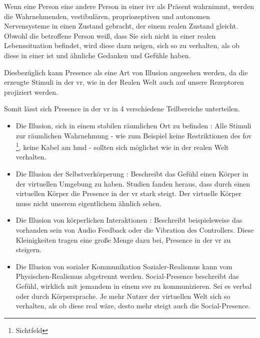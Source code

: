 \documentclass[a4paper,11pt]{article}%
\renewcommand{\\}{\vspace*{0.5\baselineskip} \newline}
\begin{document}
	Wenn eine Person eine andere Person in einer \ac{ivr} als Präsent wahrnimmt, werden die Wahrnehmenden, vestibulären, propriozeptiven und autonomen Nervensysteme in einen Zustand gebracht, der einem realen Zustand gleicht. Obwohl die betroffene Person weiß, dass Sie sich nicht in einer realen Lebenssituation befindet, wird diese dazu neigen, sich so zu verhalten, als ob diese in einer ist und ähnliche Gedanken und Gefühle haben. \citep{slater2003note}

Diesbezüglich kann \dq Presence\dq{} als eine Art von Illusion angesehen werden, da die erzeugte Stimuli in der \ac{vr}, wie in der Realen Welt auch auf unsere Rezeptoren projiziert werden.

Somit lässt sich \dq Presence\dq{} in der \ac{vr} in 4 verschiedene Teilbereiche unterteilen.

\begin{itemize}
	\item{Die Illusion, sich in einem stabilen räumlichen Ort zu befinden} : Alle Stimuli zur räumlichen Wahrnehmung - wie zum Beispiel keine Restriktionen des \ac{fov} \footnote{Sichtfeld}, keine Kabel am \ac{hmd} - sollten sich möglichst wie in der realen Welt verhalten. \citep[p.47]{jerald2015vr}
	\item{Die Illusion der Selbstverkörperung} : Beschreibt das Gefühl einen Körper in der virtuellen Umgebung zu haben. Studien fanden heraus, dass durch einen virtuellen Körper die \dq Presence\dq{} in der \ac{vr} stark steigt. \citep[p.756]{botvinick1998rubber} Der virtuelle Körper muss nicht unserem eigentlichem ähnlich sehen. \citep[p.7]{maxwell1960psycho}
	\item{Die Illusion von körperlichen Interaktionen} : Beschreibt beispielsweise das vorhanden sein von Audio Feedback oder die Vibration des Controllers. Diese Kleinigkeiten tragen eine große Menge dazu bei, \dq Presence \dq{} in der \ac{vr} zu steigern. \citep[p.48]{jerald2015vr}
	\item{Die Illusion von sozialer Kommunikation} Sozialer-Realismus kann vom Physischen-Realismus abgetrennt werden. Social-Presence beschreibt das Gefühl, wirklich mit jemandem in einem \ac{sve} zu kommunizieren. Sei es verbal oder durch Körpersprache. Je mehr Nutzer der virtuellen Welt sich so verhalten, als ob diese real wäre, desto mehr steigt auch die \dq Social-Presence\dq{}. \citep[p.49]{jerald2015vr} \citep[p.12]{guadagno2007virtual}
\end{itemize}

\end{document}
